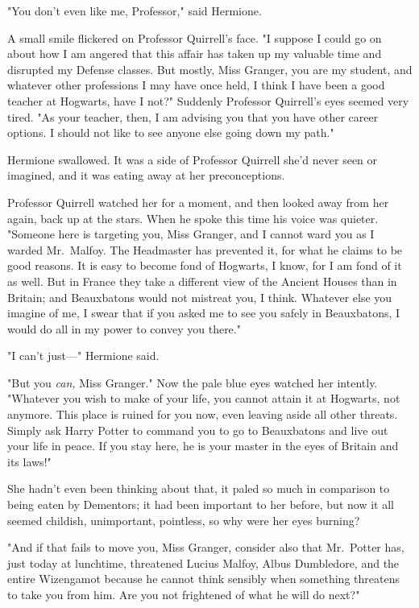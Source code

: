 "You don't even like me, Professor," said Hermione.

A small smile flickered on Professor Quirrell's face. "I suppose I could go on
about how I am angered that this affair has taken up my valuable time and
disrupted my Defense classes. But mostly, Miss Granger, you are my student, and
whatever other professions I may have once held, I think I have been a good
teacher at Hogwarts, have I not?" Suddenly Professor Quirrell's eyes seemed
very tired. "As your teacher, then, I am advising you that you have other
career options. I should not like to see anyone else going down my path."

Hermione swallowed. It was a side of Professor Quirrell she'd never seen or
imagined, and it was eating away at her preconceptions.

Professor Quirrell watched her for a moment, and then looked away from her
again, back up at the stars. When he spoke this time his voice was quieter.
"Someone here is targeting you, Miss Granger, and I cannot ward you as I warded
Mr.~Malfoy. The Headmaster has prevented it, for what he claims to be good
reasons. It is easy to become fond of Hogwarts, I know, for I am fond of it as
well. But in France they take a different view of the Ancient Houses than in
Britain; and Beauxbatons would not mistreat you, I think. Whatever else you
imagine of me, I swear that if you asked me to see you safely in Beauxbatons, I
would do all in my power to convey you there."

"I can't just---" Hermione said.

"But you \emph{can,} Miss Granger." Now the pale blue eyes watched her
intently. "Whatever you wish to make of your life, you cannot attain it at
Hogwarts, not anymore. This place is ruined for you now, even leaving aside all
other threats. Simply ask Harry Potter to command you to go to Beauxbatons and
live out your life in peace. If you stay here, he is your master in the eyes of
Britain and its laws!"

She hadn't even been thinking about that, it paled so much in comparison to
being eaten by Dementors; it had been important to her before, but now it all
seemed childish, unimportant, pointless, so why were her eyes burning?

"And if that fails to move you, Miss Granger, consider also that Mr.~Potter
has, just today at lunchtime, threatened Lucius Malfoy, Albus Dumbledore, and
the entire Wizengamot because he cannot think sensibly when something threatens
to take you from him. Are you not frightened of what he will do next?"

